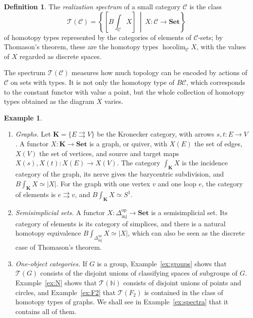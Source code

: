 \documentclass[11pt]{amsart}
\theoremstyle{definition}
\newtheorem{definition}[teo]{Definition}
\newtheorem{example}[teo]{Example}
\theoremstyle{remark}
\numberwithin{figure}{section}%
\newcommand{\CC}{\mathcal{C}}
\DeclareMathOperator{\hocolim}{hocolim}
\newcommand{\T}{\mathcal{T}}
\newcommand{\Set}{\mathbf{Set}}
\newcommand{\Dinj}{\Delta_{\mathrm{inj}}}
\newcommand{\op}{\mathrm{op}}
\begin{document}
\begin{definition}
\label{def:realization-spectrum}
The \emph{realization spectrum} of a small category $\CC$ is the class
\[
\T(\CC)=\left\{\left[B\!\int_{\CC}X\right]\ \middle|\ X\colon\CC\to\Set\right\}
\]
of homotopy types represented by the categories of elements of $\CC$-sets; by Thomason's theorem, these are the homotopy types $\hocolim_{\CC}X$, with the values of $X$ regarded as discrete spaces.
\end{definition}

The spectrum $\T(\CC)$ measures how much topology can be encoded by actions of $\CC$ on sets with types. It is not only the homotopy type of $B\CC$, which corresponds to the constant functor with value a point, but the whole collection of homotopy types obtained as the diagram $X$ varies.

\begin{example}
\label{ex:sorts}
\begin{enumerate}[leftmargin=*]
\item \emph{Graphs.} Let $\mathbf K=\{E\rightrightarrows V\}$ be the Kronecker category, with arrows $s,t\colon E\to V$. A functor $X\colon\mathbf K\to\Set$ is a graph, or quiver, with $X(E)$ the set of edges, $X(V)$ the set of vertices, and source and target maps $X(s),X(t)\colon X(E)\to X(V)$. The category $\int_{\mathbf K}X$ is the incidence category of the graph, its nerve gives the barycentric subdivision, and $B\!\int_{\mathbf K}X\simeq|X|$. For the graph with one vertex $v$ and one loop $e$, the category of elements is $e\rightrightarrows v$, and $B\!\int_{\mathbf K}X\simeq S^1$.
\item \emph{Semisimplicial sets.} A functor $X\colon\Dinj^{\op}\to\Set$ is a semisimplicial set. Its category of elements is its category of simplices, and there is a natural homotopy equivalence $B\!\int_{\Dinj^{\op}}X\simeq|X|$, which can also be seen as the discrete case of Thomason's theorem.
\item \emph{One-object categories.} If $G$ is a group, Example~\ref{ex:groups} shows that $\T(G)$ consists of the disjoint unions of classifying spaces of subgroups of $G$. Example~\ref{ex:N} shows that $\T(\mathbb N)$ consists of disjoint unions of points and circles, and Example~\ref{ex:F2} that $\T(F_2)$ is contained in the class of homotopy types of graphs. We shall see in Example~\ref{ex:spectra} that it contains all of them.
\end{enumerate}
\end{example}
\end{document}
